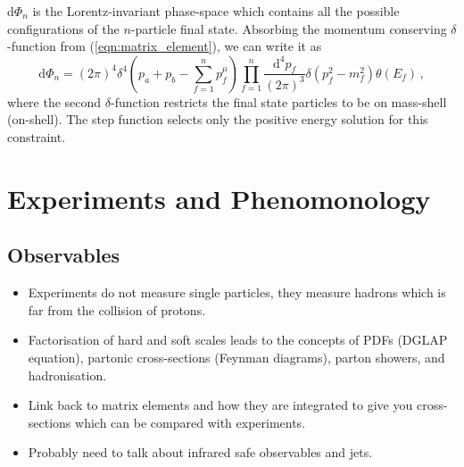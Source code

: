\documentclass[main.tex]{subfiles}
\begin{document}
    $\mathrm{d}\Phi_{n}$ is the Lorentz-invariant
    phase-space which contains all the possible
    configurations of the $n$-particle final state.
    Absorbing the momentum conserving $\delta$-function
    from (\ref{eqn:matrix_element}),
    we can write it as
    \begin{equation}\label{eqn:dlips_4d}
        \mathrm{d}\Phi_{n} = (2\pi)^{4}\delta^{4}\left(p_{a} + p_{b} - \sum_{f=1}^{n} p_{f}^{\mu}\right) \prod_{f=1}^{n} \dfrac{\mathrm{d}^{4}p_{f}}{(2\pi)^{3}}\delta(p_{f}^{2} - m_{f}^{2})\theta(E_{f}) \, ,
    \end{equation}
    where the second $\delta$-function restricts
    the final state particles to be on mass-shell
    (on-shell). The step function selects only
    the positive energy solution for this constraint.
\section{Experiments and Phenomonology}
\subsection{Observables}
\begin{itemize}
    \item Experiments do not measure single particles,
    they measure hadrons which is far from the collision
    of protons.
    \item Factorisation of hard and soft scales leads
    to the concepts of PDFs (DGLAP equation), partonic
    cross-sections (Feynman diagrams), parton showers,
    and hadronisation.
    \item Link back to matrix elements and how they
    are integrated to give you cross-sections which
    can be compared with experiments.
    \item Probably need to talk about infrared safe
    observables and jets.
\end{itemize}
\end{document}
